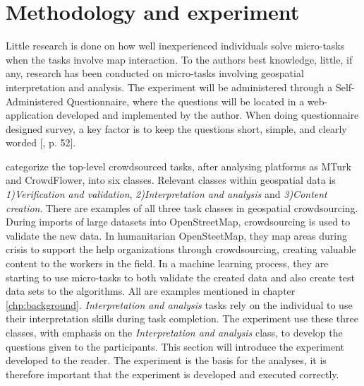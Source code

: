 \chapter{Methodology and experiment}
Little research is done on how well inexperienced individuals solve micro-tasks when the tasks involve map interaction. To the authors best knowledge, little, if any, research has been conducted on micro-tasks involving geospatial interpretation and analysis. The experiment will be administered through a Self-Administered Questionnaire, where the questions will be located in a web-application developed and implemented by the author. When doing questionnaire designed survey, a key factor is to keep the questions short, simple, and clearly worded [\citep{Kitchin2000}, p. 52].

\cite{Gadiraju2015} categorize the top-level crowdsourced tasks, after analysing platforms as MTurk and CrowdFlower, into six classes. Relevant classes within geospatial data is \textit{1)Verification and validation}, \textit{2)Interpretation and analysis} and \textit{3)Content creation}. There are examples of all three task classes in geospatial crowdsourcing. During imports of large datasets into OpenStreetMap, crowdsourcing is used to validate the new data. In humanitarian OpenSteetMap, they map areas during crisis to support the help organizations through crowdsourcing, creating valuable content to the workers in the field. In a machine learning process, they are starting to use micro-tasks to both validate the created data and also create test data sets to the algorithms. All are examples mentioned in chapter \ref{chp:background}. \textit{Interpretation and analysis} tasks rely on the individual to use their interpretation skills during task completion. The experiment use these three classes, with emphasis on the \textit{Interpretation and analysis} class, to develop the questions given to the participants. This section will introduce the experiment developed to the reader. The experiment is the basis for the analyses, it is therefore important that the experiment is developed and executed correctly.


